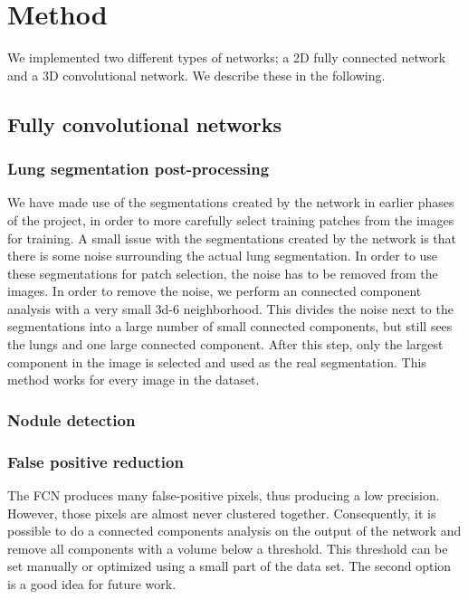 \documentclass{article}
\begin{document}
\section{Method}\label{sec:method} 
We implemented two different types of networks; a 2D fully connected network and a 3D convolutional network. We describe these in the following.

\subsection{Fully convolutional networks}
\subsubsection{Lung segmentation post-processing}
We have made use of the segmentations created by the network in earlier phases of the project, in order to more carefully select training patches from the images for training. A small issue with the segmentations created by the network is that there is some noise surrounding the actual lung segmentation. In order to use these segmentations for patch selection, the noise has to be removed from the images. In order to remove the noise, we perform an connected component analysis with a very small 3d-6 neighborhood. This divides the noise next to the segmentations into a large number of small connected components, but still sees the lungs and one large connected component. After this step, only the largest component in the image is selected and used as the real segmentation. This method works for every image in the dataset.
\cite{long}

\subsubsection{Nodule detection}
\label{sec:fcn}


\subsubsection{False positive reduction}
The FCN produces many false-positive pixels, thus producing a low precision. However, those pixels are almost never clustered together. Consequently, it is possible to do a connected components analysis on the output of the network and remove all components with a volume below a threshold. This threshold can be set manually or optimized using a small part of the data set. The second option is a good idea for future work.
\end{document}
